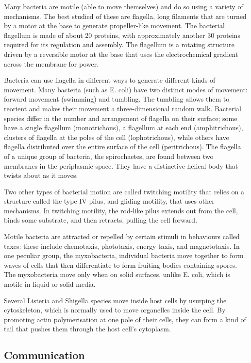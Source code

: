 Many bacteria are motile (able to move themselves) and do so using a variety of mechanisms. The best studied of these are flagella, long filaments that are turned by a motor at the base to generate propeller-like movement. The bacterial flagellum is made of about 20 proteins, with approximately another 30 proteins required for its regulation and assembly. The flagellum is a rotating structure driven by a reversible motor at the base that uses the electrochemical gradient across the membrane for power.

Bacteria can use flagella in different ways to generate different kinds of movement. Many bacteria (such as E. coli) have two distinct modes of movement: forward movement (swimming) and tumbling. The tumbling allows them to reorient and makes their movement a three-dimensional random walk. Bacterial species differ in the number and arrangement of flagella on their surface; some have a single flagellum (monotrichous), a flagellum at each end (amphitrichous), clusters of flagella at the poles of the cell (lophotrichous), while others have flagella distributed over the entire surface of the cell (peritrichous). The flagella of a unique group of bacteria, the spirochaetes, are found between two membranes in the periplasmic space. They have a distinctive helical body that twists about as it moves.

Two other types of bacterial motion are called twitching motility that relies on a structure called the type IV pilus, and gliding motility, that uses other mechanisms. In twitching motility, the rod-like pilus extends out from the cell, binds some substrate, and then retracts, pulling the cell forward.

Motile bacteria are attracted or repelled by certain stimuli in behaviours called taxes: these include chemotaxis, phototaxis, energy taxis, and magnetotaxis. In one peculiar group, the myxobacteria, individual bacteria move together to form waves of cells that then differentiate to form fruiting bodies containing spores. The myxobacteria move only when on solid surfaces, unlike E. coli, which is motile in liquid or solid media.

Several Listeria and Shigella species move inside host cells by usurping the cytoskeleton, which is normally used to move organelles inside the cell. By promoting actin polymerisation at one pole of their cells, they can form a kind of tail that pushes them through the host cell's cytoplasm.

\hypertarget{communication}{%
\subsection{Communication}\label{communication}}

